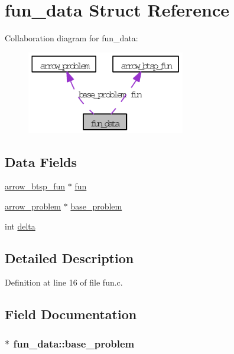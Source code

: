 \hypertarget{structfun__data}{
\section{fun\_\-data Struct Reference}
\label{structfun__data}
}
Collaboration diagram for fun\_\-data:\nopagebreak
\begin{figure}[H]
\begin{center}
\leavevmode
\includegraphics[width=196pt]{structfun__data__coll__graph}
\end{center}
\end{figure}
\subsection*{Data Fields}
\begin{CompactItemize}
\item 
\hyperlink{structarrow__btsp__fun}{arrow\_\-btsp\_\-fun} $\ast$ \hyperlink{structfun__data_a4103cadf3d844dc528d9e02884cfc98}{fun}
\item 
\hyperlink{structarrow__problem}{arrow\_\-problem} $\ast$ \hyperlink{structfun__data_8975a7eed7c3a3fa00f7a15c54e1c80b}{base\_\-problem}
\item 
int \hyperlink{structfun__data_1d0479ab1ce43aa65ba7cac44874d414}{delta}
\end{CompactItemize}


\subsection{Detailed Description}


Definition at line 16 of file fun.c.

\subsection{Field Documentation}
\hypertarget{structfun__data_8975a7eed7c3a3fa00f7a15c54e1c80b}{
\subsubsection[{base\_\-problem}]{$\ast$ {\bf fun\_\-data::base\_\-problem}}}
\label{structfun__data_8975a7eed7c3a3fa00f7a15c54e1c80b}


